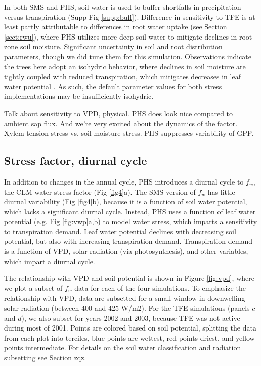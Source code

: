 \documentclass[draft,linenumbers]{agujournal}
\begin{document}
In both SMS and PHS, soil water is used to buffer shortfalls in precipitation versus transpiration (Supp Fig \ref{supp:buff}).
Difference in sensitivity to TFE is at least partly attributable to differences in root water uptake (see Section \ref{sect:rwu}), 
where PHS utilizes more deep soil water to mitigate declines in root-zone soil moisture.
Significant uncertainty in soil and root distribution parameters, though we did tune them for this simulation.
Observations indicate the trees here adopt an isohydric behavior, where declines in soil moisture 
are tightly coupled with reduced transpiration, which mitigates decreases in leaf water potential \citep{fisher2006}.
As such, the default parameter values for both stress implementations may be insufficiently isohydric.

Talk about sensitivity to VPD, physical.
PHS does look nice compared to ambient sap flux.
And we're very excited about the dynamics of the factor.
Xylem tension stress vs. soil moisture stress.
PHS suppresses variability of GPP.


\subsection{Stress factor, diurnal cycle}

In addition to changes in the annual cycle, PHS introduces a diurnal cycle to $f_w$, the CLM water stress factor (Fig \ref{fig4}a). 
The SMS version of $f_w$ has little diurnal variability (Fig \ref{fig4}b), because it is a function of soil water potential, which lacks a significant diurnal cycle.
Instead, PHS uses a function of leaf water potential (e.g. Fig \ref{fig:vwp}a,b) to model water stress, which imparts a sensitivity to transpiration demand.
Leaf water potential declines with decreasing soil potential, but also with increasing transpiration demand.
Transpiration demand is a function of VPD, solar radiation (via photosynthesis), and other variables, which impart a diurnal cycle.

The relationship with VPD and soil potential is shown in Figure \ref{fig:vpd}, where we plot a subset of $f_w$ data for each of the four simulations. 
To emphasize the relationship with VPD, data are subsetted for a small window in downwelling solar radiation (between 400 and 425 W/m2).
For the TFE simulations (panels $c$ and $d$), we also subset for years 2002 and 2003, because TFE was not active during most of 2001.
Points are colored based on soil potential, splitting the data from each plot into terciles, blue points are wettest, red points driest, and yellow points intermediate.
For details on the soil water classification and radiation subsetting see Section zqz.
\end{document}
